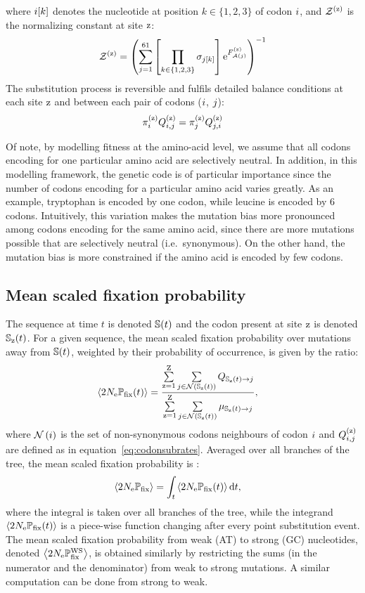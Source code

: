 \documentclass{article}
\begin{document}
where ${i}[k]$ denotes the nucleotide at position $k \in \{ 1, 2, 3 \}$ of codon ${i}$, and $\mathcal{Z}^{(\text{z})} $ is the normalizing constant at site $\text{z}$:
\begin{align}
 \mathcal{Z}^{(\text{z})} = \left( \sum\limits_{{j}=1}^{61} \left[\prod\limits_{k \in \{ 1, 2, 3 \}} \sigma_{{j}[k]}\right] \text{e}^{F_{\mathcal{A}({j})}^{(\text{z})}} \right)^{-1}
\end{align}
The {substitution} process is reversible and fulfils detailed balance conditions at each site $\text{z}$ and between each pair of codons (${i}$, ${j}$):
\begin{align}
 \pi_{{i}}^{(\text{z})} Q_{{i}, {j}}^{(\text{z})} = \pi_{{j}}^{(\text{z})} Q_{{j}, {i}}^{(\text{z})}
 \label{codonSubBalance}
\end{align}

Of note, by modelling fitness at the amino-acid level, we assume that all codons encoding for one particular amino acid are selectively {neutral}.
In addition, in this modelling framework, the genetic code is of particular importance since the number of codons encoding for a particular amino acid varies greatly.
As an example, tryptophan is encoded by one codon, while leucine is encoded by 6 codons.
Intuitively, this variation makes the mutation bias more pronounced among codons encoding for the same amino acid, since there are more mutations possible that are selectively {neutral} (i.e.~synonymous).
On the other hand, the mutation bias is more constrained if the amino acid is encoded by few codons.

\subsection{Mean scaled fixation probability}
\label{subsec:fixation-bias}
The sequence at time $t$ is denoted $\mathbb{S}(t)$ and the codon present at site $\text{z}$ is denoted $\mathbb{S}_{\text{z}}(t)$.
For a given sequence, the mean scaled fixation probability over mutations away from $\mathbb{S}(t)$, weighted by their probability of occurrence, is given by the ratio:
\begin{align}
 \left\langle 2 N_{\text{e}} \mathbb{P}_{\text{fix}} (t) \right\rangle & = \dfrac{ \sum\limits_{\text{z}=1}^{\text{Z}} \sum\limits_{{j} \in \mathcal{N} \left ( \mathbb{S}_{\text{z}}(t) \right)} Q_{\mathbb{S}_{\text{z}}(t) \to {j}}}{ \sum\limits_{\text{z}=1}^{\text{Z}} \sum\limits_{{j} \in \mathcal{N} \left ( \mathbb{S}_{\text{z}}(t) \right)} \mu_{\mathbb{S}_{\text{z}}(t) \to {j}}},
\end{align}
where $\mathcal{N}\left({i}\right)$ is the set of {non-synonymous} codons neighbours of codon ${i}$ and $Q_{{i}, {j}}^{(\text{z})}$ are defined as in equation~\ref{eq:codonsubrates}.
Averaged over all branches of the tree, the mean scaled fixation probability is :
\begin{align}
 \left\langle 2 N_{\text{e}} \mathbb{P}_{\text{fix}} \right\rangle & = \int_{t} \left\langle 2 N_{\text{e}} \mathbb{P}_{\text{fix}} (t) \right\rangle \mathrm{d} t,
\end{align}
where the integral is taken over all branches of the tree, while the integrand $\left\langle 2 N_{\text{e}} \mathbb{P}_{\text{fix}} (t) \right\rangle$ is a piece-wise function changing after every point {substitution} event.
The mean scaled fixation probability from weak (AT) to strong (GC) nucleotides, denoted $\left\langle 2 N_{\text{e}} \mathbb{P}_{\text{fix}}^{\text{WS}} \right\rangle$, is obtained similarly by restricting the sums (in the numerator and the denominator) from weak to strong mutations.
A similar computation can be done from strong to weak.
\end{document}
